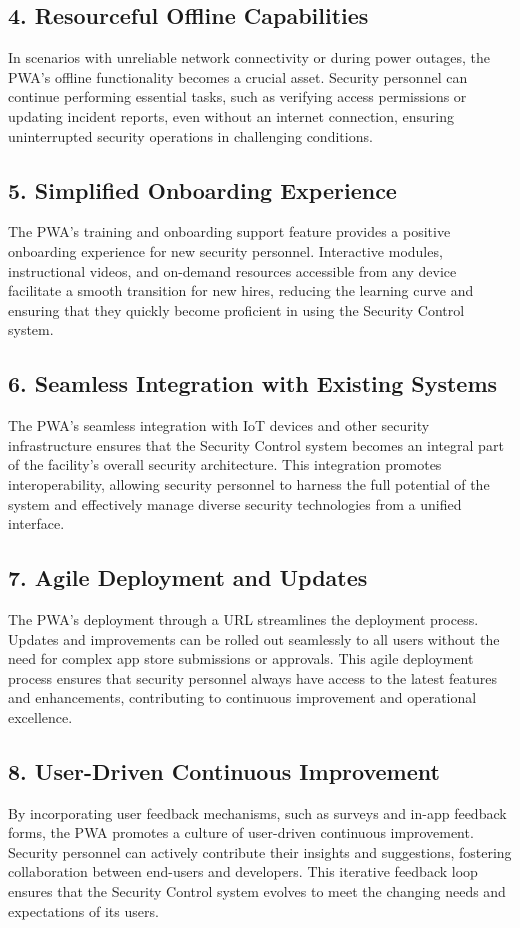 \documentclass[journal]{IEEEtran}
\begin{document}
	\subsection*{4. Resourceful Offline Capabilities}
	In scenarios with unreliable network connectivity or during power outages, the PWA's offline functionality becomes a crucial asset. Security personnel can continue performing essential tasks, such as verifying access permissions or updating incident reports, even without an internet connection, ensuring uninterrupted security operations in challenging conditions.
	
	\subsection*{5. Simplified Onboarding Experience}
	The PWA's training and onboarding support feature provides a positive onboarding experience for new security personnel. Interactive modules, instructional videos, and on-demand resources accessible from any device facilitate a smooth transition for new hires, reducing the learning curve and ensuring that they quickly become proficient in using the Security Control system.
	
	\subsection*{6. Seamless Integration with Existing Systems}
	The PWA's seamless integration with IoT devices and other security infrastructure ensures that the Security Control system becomes an integral part of the facility's overall security architecture. This integration promotes interoperability, allowing security personnel to harness the full potential of the system and effectively manage diverse security technologies from a unified interface.
	
	\subsection*{7. Agile Deployment and Updates}
	The PWA's deployment through a URL streamlines the deployment process. Updates and improvements can be rolled out seamlessly to all users without the need for complex app store submissions or approvals. This agile deployment process ensures that security personnel always have access to the latest features and enhancements, contributing to continuous improvement and operational excellence.
	
	\subsection*{8. User-Driven Continuous Improvement}
	By incorporating user feedback mechanisms, such as surveys and in-app feedback forms, the PWA promotes a culture of user-driven continuous improvement. Security personnel can actively contribute their insights and suggestions, fostering collaboration between end-users and developers. This iterative feedback loop ensures that the Security Control system evolves to meet the changing needs and expectations of its users.
	
\end{document}
